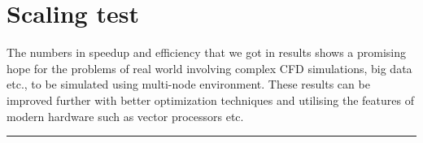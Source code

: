 \section{Scaling test} \label{st}
The numbers in speedup and efficiency that we got in results shows a promising hope for the problems of real world involving complex CFD simulations, big data etc., to be simulated using multi-node environment. These results can be improved further with better optimization techniques and utilising the features of modern hardware such as vector processors etc. 


\begin{center}
    \rule{3cm}{1pt}
\end{center}